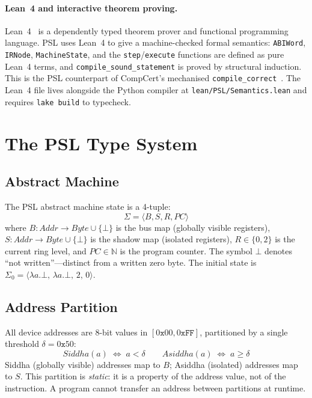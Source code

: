 \documentclass[11pt,a4paper]{article}
\begin{document}
\paragraph{Lean~4 and interactive theorem proving.}
Lean~4~\cite{moura2021lean4} is a dependently typed theorem prover and
functional programming language. PSL uses Lean~4 to give a machine-checked
formal semantics: \texttt{ABIWord}, \texttt{IRNode}, \texttt{MachineState},
and the \texttt{step}/\texttt{execute} functions are defined as pure Lean~4
terms, and \texttt{compile\_sound\_statement} is proved by structural
induction. This is the PSL counterpart of CompCert's mechanised
\texttt{compile\_correct}~\cite{leroy2009compcert}. The Lean~4 file lives
alongside the Python compiler at \texttt{lean/PSL/Semantics.lean} and
requires \texttt{lake build} to typecheck.

\section{The PSL Type System}
\label{sec:type-system}

\subsection{Abstract Machine}

The PSL abstract machine state is a 4-tuple:
\[
  \Sigma = \langle B, S, R, \mathit{PC} \rangle
\]
where $B : \mathit{Addr} \to \mathit{Byte} \cup \{\bot\}$ is the bus map
(globally visible registers), $S : \mathit{Addr} \to \mathit{Byte} \cup \{\bot\}$
is the shadow map (isolated registers), $R \in \{0, 2\}$ is the current ring
level, and $\mathit{PC} \in \mathbb{N}$ is the program counter. The symbol
$\bot$ denotes ``not written''---distinct from a written zero byte. The
initial state is $\Sigma_0 = \langle \lambda a.\bot,\, \lambda a.\bot,\, 2,\, 0\rangle$.

\subsection{Address Partition}

All device addresses are 8-bit values in $[0\texttt{x}00, 0\texttt{xFF}]$,
partitioned by a single threshold $\delta = 0\texttt{x}50$:
\[
  \mathit{Siddha}(a) \;\Leftrightarrow\; a < \delta
  \qquad
  \mathit{Asiddha}(a) \;\Leftrightarrow\; a \geq \delta
\]
Siddha (globally visible) addresses map to $B$; Asiddha (isolated) addresses
map to $S$. This partition is \emph{static}: it is a property of the address
value, not of the instruction. A program cannot transfer an address between
partitions at runtime.
\end{document}
